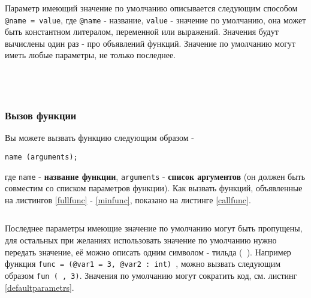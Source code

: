 Параметр имеющий значение по умолчанию описывается следующим способом \texttt{@name = value}, где \texttt{@name} - название, \texttt{value} - значение по умолчанию, она может быть константном литералом, переменной или выражений. Значения будут вычислены один раз - про объявлений функций. Значение по умолчанию могут иметь любые параметры, не только последнее.

\begin{sourcecode}
	\label{fullfunc}
	\inputminted[linenos]{icl}{../sources/fullfunc.icL}
\end{sourcecode}

\begin{sourcecode}
	\label{noargsfunc}
	\inputminted[linenos]{icl}{../sources/noargsfunc.icL}
\end{sourcecode}

\begin{sourcecode}
	\label{notypefunc}
	\inputminted[linenos]{icl}{../sources/notypefunc.icL}
\end{sourcecode}

\begin{sourcecode}
	\label{minfunc}
	\inputminted[linenos]{icl}{../sources/minfunc.icL}
\end{sourcecode}

\subsubsection{Вызов функции}

Вы можете вызвать функцию следующим образом -
\begin{verbatim}
name (arguments);
\end{verbatim}
где \texttt{name} - {\bf название функции}, \texttt{arguments} - {\bf список аргументов} (он должен быть совместим со списком параметров функции). Как вызвать функций, объявленные на листингов \ref{fullfunc} - \ref{minfunc}, показано на листинге \ref{callfunc}. 

\begin{sourcecode}
	\label{callfunc}
	\inputminted[linenos]{icl}{../sources/callfunc.icL}
\end{sourcecode}

Последнее параметры имеющие значение по умолчанию могут быть пропущены, для остальных при желаниях использовать значение по умолчанию нужно передать \void{} значение, её можно описать одним символом - тильда (\texttt{~}). Например функция \texttt{func = (@var1 = 3, @var2 : int) {}}, можно вызвать следующим образом \texttt{fun (~, 3)}. Значения по умолчанию могут сократить код, см. листинг \ref{defaultparametrs}.

